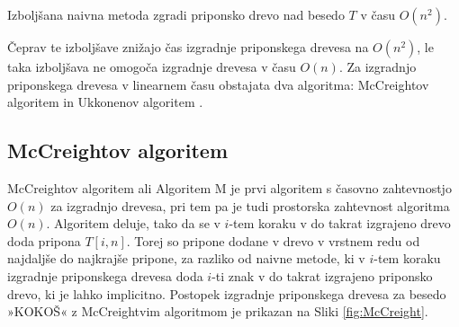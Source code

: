 \begin{izr}\label{izr:naivnaIzbolsana}
    Izboljšana naivna metoda zgradi priponsko drevo nad besedo $T$ v času $O(n^2)$.
\end{izr}

%

Čeprav te izboljšave znižajo čas izgradnje priponskega drevesa na $O(n^2)$, le taka izboljšava ne omogoča izgradnje drevesa v času $O(n)$. Za izgradnjo priponskega drevesa v linearnem času obstajata dva algoritma: McCreightov algoritem \cite{McCreight1976} in Ukkonenov algoritem \cite{Ukkonen1995}. 

\subsection{McCreightov algoritem}
McCreightov algoritem ali Algoritem M je prvi algoritem s časovno zahtevnostjo $O(n)$ za izgradnjo drevesa, pri tem pa je tudi prostorska zahtevnost algoritma $O(n)$.
Algoritem deluje, tako da se v $i$-tem koraku v do takrat izgrajeno drevo doda pripona $T[i,n]$. Torej so pripone dodane v drevo v vrstnem redu od najdaljše do najkrajše pripone, za razliko od naivne metode, ki v $i$-tem koraku izgradnje priponskega drevesa doda $i$-ti znak v do takrat izgrajeno priponsko drevo, ki je lahko implicitno. Postopek izgradnje priponskega drevesa za besedo »KOKOŠ« z McCreightvim algoritmom je prikazan na Sliki \ref{fig:McCreight}.

